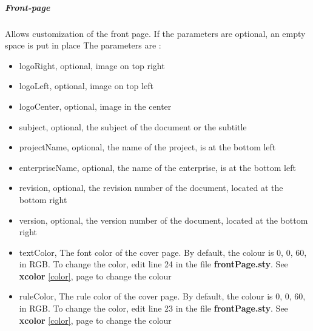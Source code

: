\subparagraph{Front-page}
Allows customization of the front page. If the parameters are optional, an empty space is put in
place
The parameters are :
\begin{itemize}
    \item logoRight, optional, image on top right
    \item logoLeft, optional, image on top left
    \item logoCenter, optional, image in the center
    \item subject, optional, the subject of the document or the subtitle
    \item projectName, optional, the name of the project, is at the bottom left
    \item enterpriseName, optional, the name of the enterprise, is at the bottom left
    \item revision, optional, the revision number of the document, located at the bottom right
    \item version, optional, the version number of the document, located at the bottom right
    \item textColor, The font color of the cover page. By default, the colour is 0, 0, 60, in RGB.
          To change the color, edit line 24 in the file \textbf{frontPage.sty}. See \textbf{xcolor}
          \ref{color}, page \pageref{color} to change the colour
    \item ruleColor, The rule color of the cover page. By default, the colour is 0, 0, 60, in RGB.
          To change the color, edit line 23 in the file \textbf{frontPage.sty}. See \textbf{xcolor}
          \ref{color}, page \pageref{color} to change the colour
\end{itemize}

